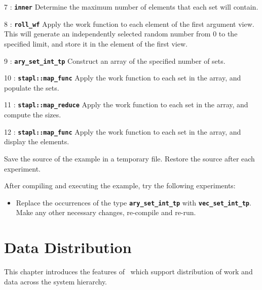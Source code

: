 \documentclass{report}
\begin{document}
\begin{hashitemize}
\item 7 : \texttt{{\bf inner}}
\newline
Determine the maximum number of elements that each set will contain.

\item 8 : \texttt{{\bf roll\_wf}}
\newline
Apply the work function to each element of the first argument view.
This will generate an independently selected random number from 0 to
the specified limit, and store it in the element of the first view.

\item 9 : \texttt{{\bf ary\_set\_int\_tp}}
\newline
Construct an array of the specified number of sets.

\item 10 : \texttt{{\bf stapl::map\_func}}
\newline
Apply the work function to each set in the array, and populate the sets.

\item 11 : \texttt{{\bf stapl::map\_reduce}}
\newline
Apply the work function to each set in the array, and compute the sizes.

\item 12 : \texttt{{\bf stapl::map\_func}}
\newline
Apply the work function to each set in the array, and display the elements.

\end{hashitemize}

Save the source of the example in a temporary file.
Restore the source after each experiment.

After compiling and executing the example, try the following experiments:
\begin{itemize}
\item
Replace the occurrences of the type
\texttt{{\bf ary\_set\_int\_tp}}
with
\texttt{{\bf vec\_set\_int\_tp}}.
Make any other necessary changes, re-compile and re-run.
\end{itemize}


\chapter{Data Distribution}

This chapter introduces the features of \stapl\ which support 
distribution of work and data across the system hierarchy.
\end{document}
